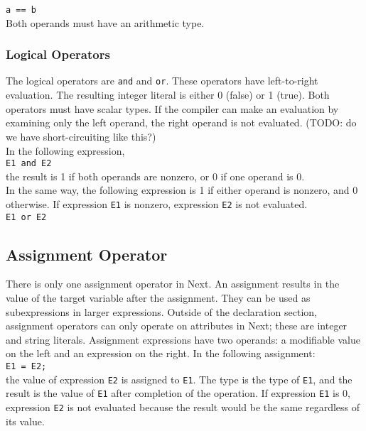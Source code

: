 \documentclass[12pt]{article}
\begin{document}
\texttt{a == b} \\

\noindent  Both operands must have an arithmetic type.

\subsubsection{Logical Operators}
The logical operators are \texttt{and} and \texttt{or}.  These operators have left-to-right evaluation.  The resulting integer literal is either 0 (false) or 1 (true).  Both operators must have scalar types.  If the compiler can make an evaluation by examining only the left operand, the right operand is not evaluated.  (TODO: do we have short-circuiting like this?) \\

\noindent In the following expression, \\

\texttt{E1 and E2} \\

\noindent the result is 1 if both operands are nonzero, or 0 if one operand is 0.\\

\noindent In the same way, the following expression is 1 if either operand is nonzero, and 0 otherwise.  If expression \texttt{E1} is nonzero, expression \texttt{E2} is not evaluated. \\

\texttt{E1 or E2}

\subsection{Assignment Operator}
There is only one assignment operator in Next.  An assignment results in the value of the target variable after the assignment.  They can be used as subexpressions in larger expressions.  Outside of the declaration section, assignment operators can only operate on attributes in Next; these are integer and string literals.  Assignment expressions have two operands: a modifiable value on the left and an expression on the right.  In the following assignment: \\

\texttt{E1 = E2;} \\

\noindent the value of expression \texttt{E2} is assigned to \texttt{E1}.  The type is the type of \texttt{E1}, and the result is the value of \texttt{E1} after completion of the operation.  If expression \texttt{E1} is 0, expression \texttt{E2} is not evaluated because the result would be the same regardless of its value. 
\end{document}

